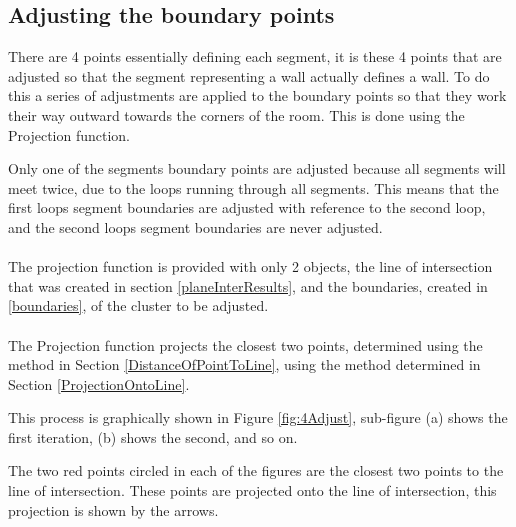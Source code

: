 		\subsection{Adjusting the boundary points}
			There are 4 points essentially defining each segment, it is these 4 points that are adjusted so that the segment representing a wall actually defines a wall. To do this a series of adjustments are applied to the boundary points so that they work their way outward towards the corners of the room. This is done using the Projection function.
			
			Only one of the segments boundary points are adjusted because all segments will meet twice, due to the loops running through all segments. This means that the first loops segment boundaries are adjusted with reference to the second loop, and the second loops segment boundaries are never adjusted.\\
			\\
			The projection function is provided with only 2 objects, the line of intersection that was created in section \ref{planeInterResults}, and the boundaries, created in \ref{boundaries}, of the cluster to be adjusted.\\
			\\
			The Projection function projects the closest two points, determined using the method in Section \ref{DistanceOfPointToLine}, using the method determined in Section \ref{ProjectionOntoLine}.
			
			This process is graphically shown in Figure \ref{fig:4Adjust}, sub-figure (a) shows the first iteration, (b) shows the second, and so on.
			
			The two red points circled in each of the figures are the closest two points to the line of intersection. These points are projected onto the line of intersection, this projection is shown by the arrows.
			
